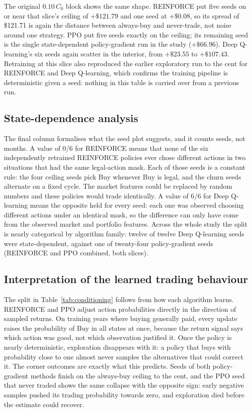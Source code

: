 The original $0.10\,C_0$ block shows the same shape. REINFORCE put five
seeds on or near that slice's ceiling of $+\$121.79$ and one seed at
$+\$0.08$, so its spread of \$121.71 is again the distance between
always-buy and never-trade, not noise around one strategy. PPO put five
seeds exactly on the ceiling; its remaining seed is the single
state-dependent policy-gradient run in the study ($+\$66.96$). Deep
Q-learning's six seeds again scatter in the interior, from $+\$23.55$ to
$+\$107.43$. Retraining at this slice also reproduced the earlier
exploratory run to the cent for REINFORCE and Deep Q-learning, which
confirms the training pipeline is deterministic given a seed: nothing in
this table is carried over from a previous run.

\subsection{State-dependence analysis}

The final column formalises what the seed plot suggests, and it counts
seeds, not months. A value of 0/6 for REINFORCE means that none of the six
independently retrained REINFORCE policies ever chose different actions in
two situations that had the same legal-action mask. Each of those seeds is
a constant rule: the four ceiling seeds pick Buy whenever Buy is legal,
and the churn seeds alternate on a fixed cycle. The market features could
be replaced by random numbers and these policies would trade identically.
A value of 6/6 for Deep Q-learning means the opposite held for every seed:
each one was observed choosing different actions under an identical mask,
so the difference can only have come from the observed market and
portfolio features. Across the whole study the split is nearly categorical
by algorithm family: twelve of twelve Deep Q-learning seeds were
state-dependent, against one of twenty-four policy-gradient seeds
(REINFORCE and PPO combined, both slices).

\subsection{Interpretation of the learned trading behaviour}

The split in Table~\ref{tab:conditioning} follows from how each algorithm
learns. REINFORCE and PPO adjust action probabilities directly in the
direction of sampled returns. On training years where buying generally
paid, every update raises the probability of Buy in all states at once,
because the return signal says which action was good, not which
observation justified it. Once the policy is nearly deterministic,
exploration disappears with it: a policy that buys with probability close
to one almost never samples the alternatives that could correct it. The
corner outcomes are exactly what this predicts. Seeds of both
policy-gradient methods finish on the always-buy ceiling to the cent, and
the PPO seed that never traded shows the same collapse with the opposite
sign: early negative samples pushed its trading probability towards zero,
and exploration died before the estimate could recover.


